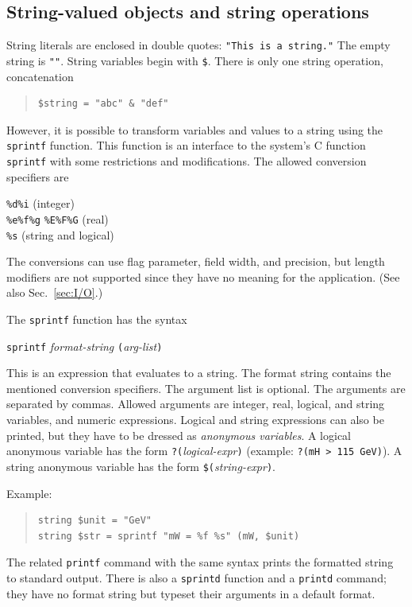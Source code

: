 \documentclass[12pt]{book}
\newcommand{\ttt}[1]{\texttt{#1}}
\begin{document}
\subsection{String-valued objects and string operations}
\label{sec:sprintf}

String literals are enclosed in double quotes: \ttt{"This is a string."}
The empty string is \ttt{""}.  String variables begin with \verb|$|.
There is only one string operation, concatenation
\begin{quote}
\begin{footnotesize}
\begin{verbatim}
$string = "abc" & "def"
\end{verbatim}
\end{footnotesize}
\end{quote}

However, it is possible to transform variables and values to a string using
the \ttt{sprintf} function.  This function is an interface to the system's C
function \ttt{sprintf} with some restrictions and modifications.  The allowed
conversion specifiers are
\begin{center}
  \verb|%d|\quad \verb|%i| (integer)
\\
  \verb|%e|\quad \verb|%f|\quad \verb|%g|\quad
  \verb|%E|\quad \verb|%F|\quad \verb|%G| (real)
\\
  \verb|%s| (string and logical)
\end{center}
The conversions can use flag parameter, field width, and precision, but length
modifiers are not supported since they have no meaning for the application.
(See also Sec.~\ref{sec:I/O}.)

The \ttt{sprintf} function has the syntax
\begin{center}
  \ttt{sprintf} \textit{format-string}
  \ttt{(}\textit{arg-list}\ttt{)}
\end{center}
This is an expression that evaluates to a string.  The format string contains
the mentioned conversion specifiers.  The argument list is optional.  The
arguments are separated by commas.  Allowed arguments are integer, real,
logical, and string variables, and numeric expressions.  Logical and string
expressions can also be printed, but they have to be dressed as
\emph{anonymous variables}.  A logical anonymous variable has the form
\ttt{?(}\textit{logical-expr}\ttt{)} (example: \ttt{?(mH > 115 GeV)}).  A
string anonymous variable has the form \ttt{\$(}\textit{string-expr}\ttt{)}.

Example:
\begin{quote}
\begin{footnotesize}
\begin{verbatim}
string $unit = "GeV"
string $str = sprintf "mW = %f %s" (mW, $unit)
\end{verbatim}
\end{footnotesize}
\end{quote}
The related \ttt{printf} command with the same syntax prints the formatted
string to standard output.  There is also a \ttt{sprintd} function and a
\ttt{printd} command; they have no format string but typeset their
arguments in a default format. 
\end{document}
